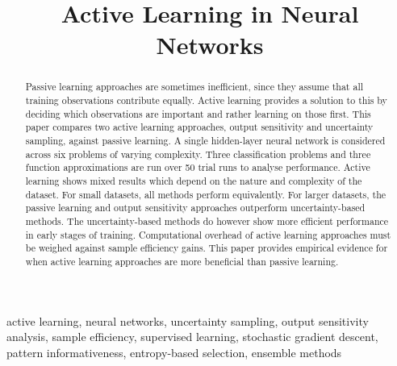 \documentclass[10pt, conference]{IEEEtran}
\begin{document}
\title{Active Learning in Neural Networks\\

}

\author{
}

\maketitle

\begin{abstract}
Passive learning approaches are sometimes inefficient, since they assume that all training observations contribute equally. Active learning provides a solution to this by deciding which observations are important and rather learning on those first. This paper compares two active learning approaches, output sensitivity and uncertainty sampling, against passive learning. A single hidden-layer neural network is considered across six problems of varying complexity. Three classification problems and three function approximations are run over 50 trial runs to analyse performance. Active learning shows mixed results which depend on the nature and complexity of the dataset. For small datasets, all methods perform equivalently. For larger datasets, the passive learning and output sensitivity approaches outperform uncertainty-based methods. The uncertainty-based methods do however show more efficient performance in early stages of training. Computational overhead of active learning approaches must be weighed against sample efficiency gains. This paper provides empirical evidence for when active learning approaches are more beneficial than passive learning.
\end{abstract}

\begin{IEEEkeywords}
active learning, neural networks, uncertainty sampling, output sensitivity analysis, sample efficiency, supervised learning, stochastic gradient descent, pattern informativeness, entropy-based selection, ensemble methods
\end{IEEEkeywords}
\end{document}
